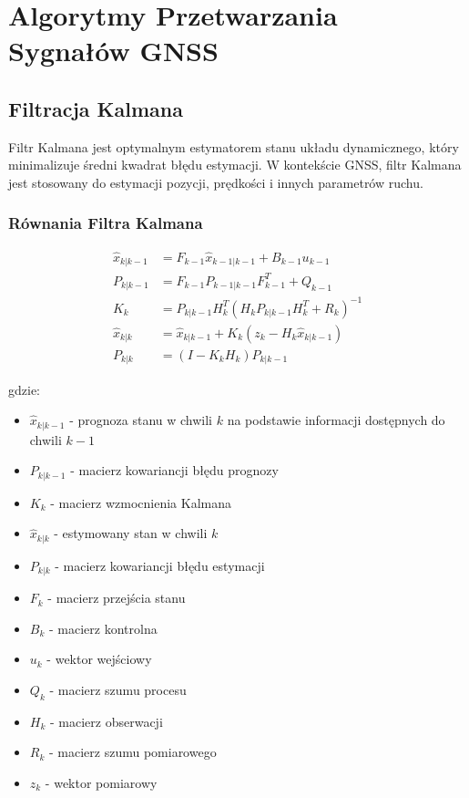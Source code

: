 \section{Algorytmy Przetwarzania Sygnałów GNSS}

\subsection{Filtracja Kalmana}
Filtr Kalmana jest optymalnym estymatorem stanu układu dynamicznego, który minimalizuje średni kwadrat błędu estymacji. W kontekście GNSS, filtr Kalmana jest stosowany do estymacji pozycji, prędkości i innych parametrów ruchu.

\subsubsection{Równania Filtra Kalmana}
\begin{align}
\hat{x}_{k|k-1} &= F_{k-1} \hat{x}_{k-1|k-1} + B_{k-1} u_{k-1} \\
P_{k|k-1} &= F_{k-1} P_{k-1|k-1} F_{k-1}^T + Q_{k-1} \\
K_k &= P_{k|k-1} H_k^T (H_k P_{k|k-1} H_k^T + R_k)^{-1} \\
\hat{x}_{k|k} &= \hat{x}_{k|k-1} + K_k (z_k - H_k \hat{x}_{k|k-1}) \\
P_{k|k} &= (I - K_k H_k) P_{k|k-1}
\end{align}

gdzie:
\begin{itemize}
    \item \( \hat{x}_{k|k-1} \) - prognoza stanu w chwili \( k \) na podstawie informacji dostępnych do chwili \( k-1 \)
    \item \( P_{k|k-1} \) - macierz kowariancji błędu prognozy
    \item \( K_k \) - macierz wzmocnienia Kalmana
    \item \( \hat{x}_{k|k} \) - estymowany stan w chwili \( k \)
    \item \( P_{k|k} \) - macierz kowariancji błędu estymacji
    \item \( F_k \) - macierz przejścia stanu
    \item \( B_k \) - macierz kontrolna
    \item \( u_k \) - wektor wejściowy
    \item \( Q_k \) - macierz szumu procesu
    \item \( H_k \) - macierz obserwacji
    \item \( R_k \) - macierz szumu pomiarowego
    \item \( z_k \) - wektor pomiarowy
\end{itemize}


